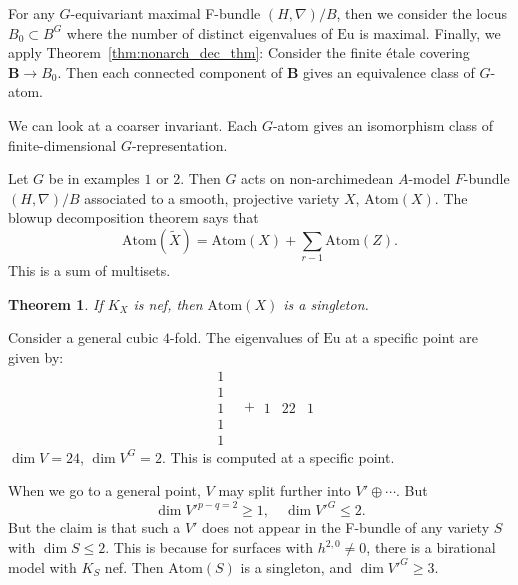 \documentclass[11pt, reqno]{amsart}
\numberwithin{equation}{section}
\theoremstyle{plain}
\newtheorem{theorem}{Theorem}[section]
\theoremstyle{definition}
\theoremstyle{italicsname}
\newcommand{\bB}{\mathbf{B}}
\newcommand{\Atom}{\mathrm{Atom}}
\newcommand{\euler}{\mathrm{Eu}}
\begin{document}
For any $G$-equivariant maximal F-bundle $(H, \nabla)/B$, then we consider the locus $B_0 \subset B^G$ where the number of distinct eigenvalues of $\euler$ is maximal. Finally, we apply Theorem~\ref{thm:nonarch_dec_thm}: Consider the finite \'etale covering $\bB \to B_0$. Then each connected component of $\bB$ gives an equivalence class of $G$-atom. 

We can look at a coarser invariant. Each $G$-atom gives an isomorphism class of finite-dimensional $G$-representation. 

Let $G$ be in examples $1$ or $2$. Then $G$ acts on non-archimedean $A$-model $F$-bundle $(H, \nabla)/B$ associated to a smooth, projective variety $X$, $\Atom(X)$. The blowup decomposition theorem says that
\[
    \Atom(\tilde X) = \Atom(X) + \sum_{r - 1} \Atom(Z).
\]
This is a sum of multisets. 

\begin{theorem}
\label{thm:main_theorem}
    If $K_X$ is nef, then $\Atom(X)$ is a singleton. 
\end{theorem}

Consider a general cubic $4$-fold. The eigenvalues of $\euler$ at a specific point are given by:
\begin{equation*}
    \begin{array}{ccc}
        & 1 & \\
        & 1 & \\
        & 1 & \\
        & 1 \\
        & 1
    \end{array} + \begin{array}{ccc}
        \\
        \\
        1 & 22 & 1 \\
        \\
        &
    \end{array}
\end{equation*}
$\dim V = 24$, $\dim V^G = 2$. This is computed at a specific point. 

When we go to a general point, $V$ may split further into $V' \oplus \cdots$. But
\[
    \dim V'^{p - q = 2} \geq 1, \quad \dim V'^G \leq 2.
\]
But the claim is that such a $V'$ does not appear in the F-bundle of any variety $S$ with $\dim S \leq 2$. This is because for surfaces with $h^{2,0} \neq 0$, there is a birational model with $K_S$ nef. Then $\Atom(S)$ is a singleton, and $\dim V'^G \geq 3$.





















\newpage
{}



\end{document}
